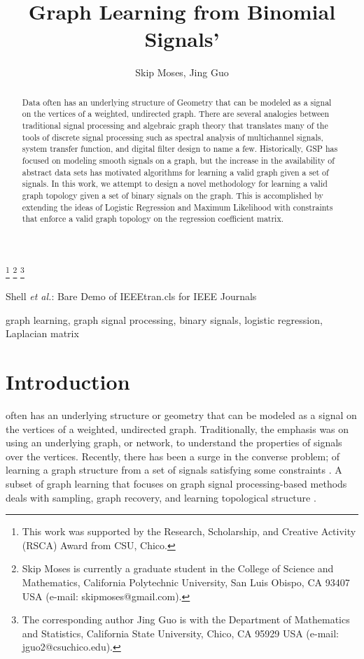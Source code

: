 \documentclass[journal]{IEEEtran}
\theoremstyle{definition}
\theoremstyle{remark}
\begin{document}
\title{Graph Learning from Binomial Signals'}

\author{Skip Moses, Jing Guo}
\thanks{This work was supported by the  Research, Scholarship, and Creative Activity (RSCA) Award from CSU, Chico. }
\thanks{Skip Moses is currently a graduate student in the College of Science and Mathematics, California Polytechnic University, San Luis Obispo, CA 93407 USA (e-mail: skipmoses@gmail.com).}
\thanks{The corresponding author Jing Guo is with the Department of Mathematics and Statistics, California State University, Chico, CA 95929 USA (e-mail: jguo2@csuchico.edu).}

{Shell \MakeLowercase{\textit{et al.}}: Bare Demo of IEEEtran.cls for IEEE Journals}
\maketitle

\begin{abstract}
Data often has an underlying structure of Geometry that can be modeled as a signal on the vertices of a weighted, undirected graph. There are several analogies between traditional signal processing and algebraic graph theory that translates many of the tools of discrete signal processing such as spectral analysis of multichannel signals, system transfer function, and digital filter design to name a few. Historically, GSP has focused on modeling smooth signals on a graph, but the increase in the availability of abstract data sets has motivated algorithms for learning a valid graph given a set of signals. In this work, we attempt to design a novel methodology for learning a valid graph topology given a set of binary signals on the graph. This is accomplished by extending the ideas of  Logistic Regression and Maximum Likelihood with constraints that enforce a valid graph topology on the regression coefficient matrix. 
\end{abstract}

\begin{IEEEkeywords}
graph learning, graph signal processing, binary signals, logistic regression, Laplacian matrix
\end{IEEEkeywords}

\section{Introduction}

 often has an underlying structure or geometry that can be modeled as a signal on the vertices of a weighted, undirected graph. Traditionally, the emphasis was on using an underlying graph, or network, to understand the properties of signals over the vertices. Recently, there has been a surge in the converse problem; of learning a graph structure from a set of signals satisfying some constraints \cite{xia2021graph} \cite{stankovic2019vertex} \cite{ortega2018graph}. A subset of graph learning that focuses on graph signal processing-based methods deals with sampling, graph recovery, and learning topological structure \cite{xia2021graph}. 
\end{document}

